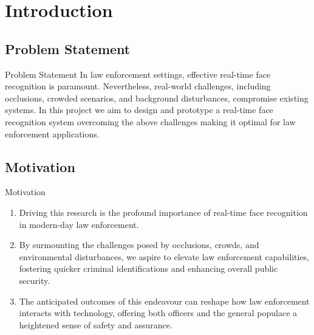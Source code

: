 \section{Introduction}

\subsection{Problem Statement}
\begin{frame}{Problem Statement}
	In law enforcement settings, effective real-time face recognition is paramount. Nevertheless, real-world challenges, including occlusions, crowded scenarios, and background disturbances, compromise existing systems. In this project we aim to design and prototype a real-time face recognition system overcoming the above challenges making it optimal for law enforcement applications.
\end{frame}

\subsection{Motivation}
\begin{frame}{Motivation}
	\begin{enumerate}
		\item Driving this research is the profound importance of real-time face recognition in modern-day law enforcement. 

		\item By surmounting the challenges posed by occlusions, crowds, and environmental disturbances, we aspire to elevate law enforcement capabilities, fostering quicker criminal identifications and enhancing overall public security. 
		
		\item The anticipated outcomes of this endeavour can reshape how law enforcement interacts with technology, offering both officers and the general populace a heightened sense of safety and assurance.	
	\end{enumerate}
\end{frame}

